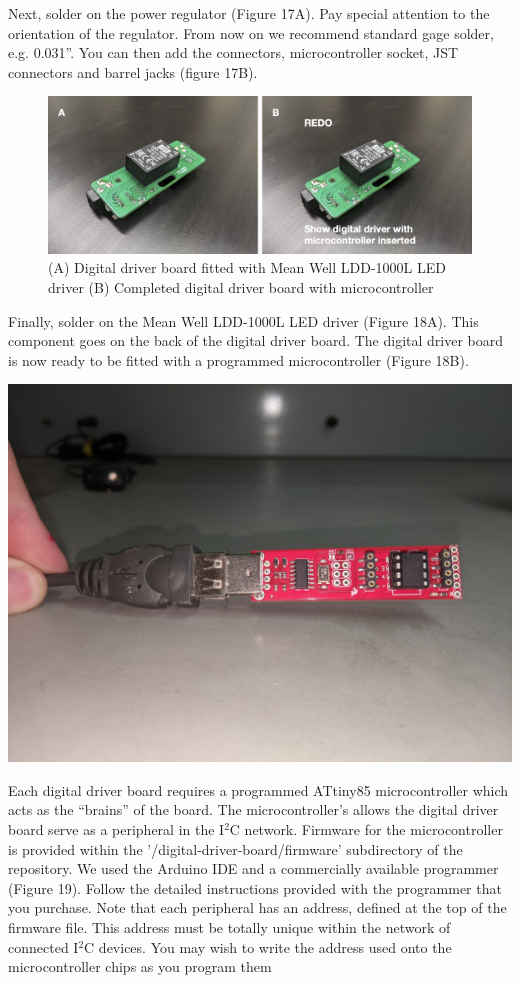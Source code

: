 \documentclass[11pt]{article}
\begin{document}
Next, solder on the power regulator (Figure 17A).
Pay special attention to the orientation of the regulator.
From now on we recommend standard gage solder, e.g. 0.031''.
You can then add the connectors, microcontroller socket, JST connectors and barrel jacks (figure 17B).

\begin{figure}[H]
	\centering
	\includegraphics[width=\textwidth]{"./fig18.png"}
	\caption{(A) Digital driver board fitted with Mean Well LDD-1000L LED driver (B) Completed digital driver board with microcontroller}
\end{figure}

Finally, solder on the Mean Well LDD-1000L LED driver (Figure 18A).
This component goes on the back of the digital driver board.
The digital driver board is now ready to be fitted with a programmed microcontroller (Figure 18B).

\begin{center}
	\includegraphics[width=\textwidth/2]{"./tiny-programmer.jpg"}
\end{center}

Each digital driver board requires a programmed ATtiny85 microcontroller which acts as the ``brains'' of the board.
The microcontroller's allows the digital driver board serve as a peripheral in the I$^2$C network.
Firmware for the microcontroller is provided within the '/digital-driver-board/firmware' subdirectory of the repository.
We used the Arduino IDE and a commercially available programmer (Figure 19).
Follow the detailed instructions provided with the programmer that you purchase.
Note that each peripheral has an address, defined at the top of the firmware file.
This address must be totally unique within the network of connected I$^2$C devices.
You may wish to write the address used onto the microcontroller chips as you program them
\end{document}
